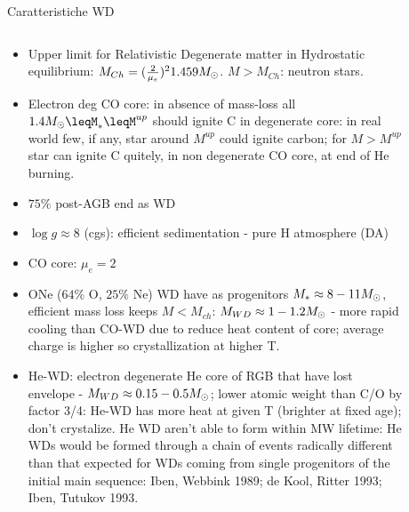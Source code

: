 \begin{frame}{Caratteristiche WD}
    \begin{columns}[T]
        \begin{column}{0.5\textwidth}
            \begin{itemize}
                \item Upper limit for Relativistic Degenerate matter in Hydrostatic equilibrium: $M_{Ch}=(\frac{2}{\mu_e})^2\num{1.459}M_{\odot}{}$. $M>M_{Ch}$: neutron stars.
                \item Electron deg CO core: in absence of mass-loss all $1.4\msun{}\leqM_*\leqM^{up}$ should ignite C in degenerate core: in real world few, if any, star around $M^{up}$ could ignite carbon; for $M>M^{up}$ star can ignite C quitely, in non degenerate CO core, at end of He burning.
                \item $75\%$ post-AGB end as WD
                \item $\log{g}\approx 8$ (cgs): efficient sedimentation - pure H atmosphere (DA)
                \item CO core: $\mu_e=2$
                \item ONe ($64\%$ O, $25\%$ Ne) WD have as progenitors $M_*\approx 8-11M_{\odot}{}$, efficient mass loss keeps $M<M_{ch}$: $M_{WD}\approx 1-1.2M_{\odot}{}$ - more rapid cooling than CO-WD due to reduce heat content of core; average charge is higher so crystallization at higher T.
                \item He-WD: electron degenerate He core of RGB that have lost envelope - $M_{WD}\approx0.15-0.5M_{\odot}{}$; lower atomic weight than C/O by factor 3/4: He-WD has more heat at given T (brighter at fixed age); don't crystalize.
                    He WD aren't able to form within MW lifetime: He WDs would be formed through a chain of events radically different than that expected for WDs coming from single progenitors of the initial main sequence: Iben, Webbink 1989; de Kool, Ritter 1993; Iben, Tutukov 1993.
            \end{itemize}
        \end{column}
        \begin{column}{0.5\textwidth}
\begin{figure}[!ht]
\texttt{[image: optical-spectrum]}\label{fig:optical-spectrum}

\end{figure}
\end{column}
\end{columns}
\end{frame}
